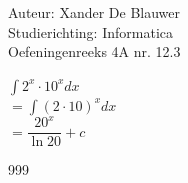 \documentclass[a4paper]{article}
\begin{document}
\noindent \large Auteur: Xander De Blauwer \\
\noindent \large Studierichting: Informatica\\
\noindent \large Oefeningenreeks 4A nr. 12.3\\

\medskip

\normalsize

$ \displaystyle\int 2^x \cdot 10^x dx $ \\

$  = \displaystyle\int (2 \cdot 10)^x dx$ \\

$  = \dfrac{20^x}{\ln 20} + c$ \\





\begin{thebibliography}{999}
\end{thebibliography}
\end{document}
